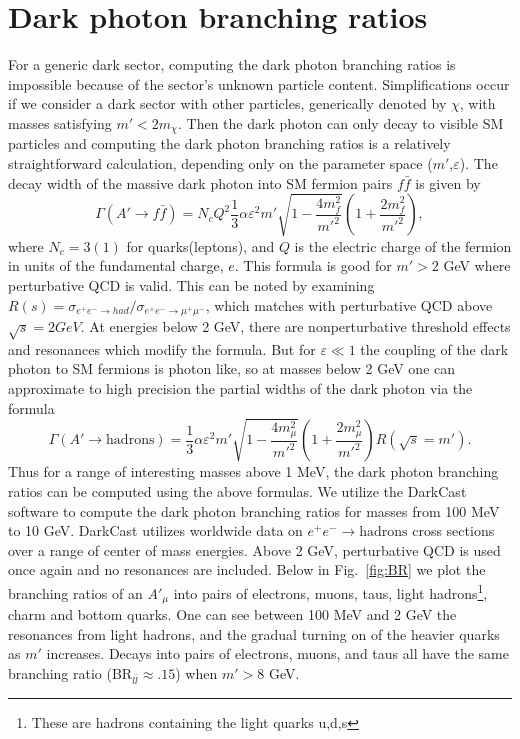 \documentclass[aps,onecolumn,twoside,secnumarabic,balancelastpage,amsmath,amssymb,nofootinbib,hyperref=pdftex]{revtex4}
\begin{document}
\section{Dark photon branching ratios}
For a generic dark sector, computing the dark photon branching ratios is impossible because of the sector's unknown particle content. Simplifications occur if we consider a dark sector with other particles, generically denoted by $\chi$, with masses satisfying $m' < 2m_{\chi}$. Then the dark photon can only decay to visible SM particles and computing the dark photon branching ratios is a relatively straightforward calculation, depending only on the parameter space ($m'$,$\varepsilon$).
\vskip 0.12in
The decay width of the massive dark photon into SM fermion pairs $f\bar{f}$ is given by
\begin{equation}
\Gamma(A' \rightarrow f\bar{f}) = N_{c}Q^{2}\frac{1}{3}\alpha\varepsilon^{2}m'\sqrt{1 - \frac{4m_{f}^{2}}{m'^{2}}}(1 + \frac{2m_{f}^{2}}{m'^{2}}),
\end{equation}
where $N_{c} = 3(1)$ for quarks(leptons), and $Q$ is the electric charge of the fermion in units of the fundamental charge, $e$. This formula is good for $m' > 2$ GeV where perturbative QCD is valid. This can be noted by examining $R(s) = \sigma_{e^{+}e^{-}\rightarrow had}/\sigma_{e^{+}e^{-}\rightarrow \mu^{+}\mu^{-}}$, which matches with perturbative QCD above $\sqrt{s} = 2 GeV$. At energies below 2 GeV, there are nonperturbative threshold effects and resonances which modify the formula. But for $\varepsilon \ll 1$ the coupling of the dark photon to SM fermions is photon like, so at masses below 2 GeV one can approximate to high precision the partial widths of the dark photon via the formula
\begin{equation}
\Gamma(A' \rightarrow \text{hadrons}) = \frac{1}{3}\alpha\varepsilon^{2}m'\sqrt{1 - \frac{4m_{\mu}^{2}}{m'^{2}}}(1 + \frac{2m_{\mu}^{2}}{m'^{2}})R(\sqrt{s} = m').
\end{equation}
Thus for a range of interesting masses above 1 MeV, the dark photon branching ratios can be computed using the above formulas. We utilize the DarkCast software to compute the dark photon branching ratios for masses from 100 MeV to 10 GeV. DarkCast utilizes worldwide data on $e^{+}e^{-}\rightarrow\text{hadrons}$ cross sections over a range of center of mass energies. Above 2 GeV, perturbative QCD is used once again and no resonances are included. Below in Fig.~\ref{fig:BR} we plot the branching ratios of an $A'_{\mu}$ into pairs of electrons, muons, taus, light hadrons\footnote{These are hadrons containing the light quarks u,d,s}, charm and bottom quarks. One can see between 100 MeV and 2 GeV the resonances from light hadrons, and the gradual turning on of the heavier quarks as $m'$ increases. Decays into pairs of electrons, muons, and taus all have the same branching ratio ($\text{BR}_{l\bar{l}}\approx .15$) when $m' > 8$ GeV.
\end{document}
